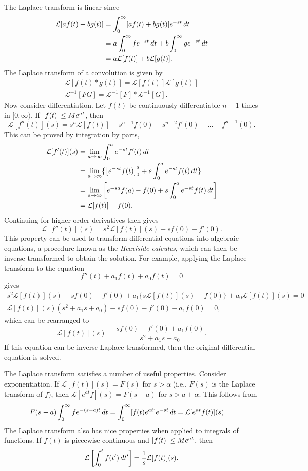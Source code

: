 The Laplace transform is linear since
\begin{align*}
	\mathcal{L}[af(t)+bg(t)]&=\int_0^{\infty}[af(t)+bg(t)]e^{-st}\mathop{}\!d t\\
	&=a\int_0^{\infty}fe^{-st}\mathop{}\!d t+b\int_0^{\infty}ge^{-st}\mathop{}\!d t\\		
	& =	a\mathcal{L}[f(t)]+b\mathcal{L}[g(t)].	
\end{align*}
The Laplace transform of a convolution is given by
\begin{align*}
	\mathcal{L}[f(t)*g(t)]=\mathcal{L}[f(t)]\mathcal{L}[g(t)]\\ \mathcal{L}^{-1}[FG]=\mathcal{L}^{-1}[F]*\mathcal{L}^{-1}[G].
\end{align*}
Now consider differentiation. Let $ f(t) $ be continuously differentiable $ n-1 $ times in $ [0,\infty) $. If $ \left\lvert f(t)\right\rvert\leq Me^{at} $, then
\[
\mathcal{L}[f^{n}(t)](s)=s^n\mathcal{L}[f(t)]-s^{n-1}f(0)-s^{n-2}f'(0)-\ldots-f^{n-1}(0).\]
This can be proved by integration by parts,
\begin{align*}
	\mathcal{L}[f'(t)](s)&=\lim_{a\to\infty}\int_0^a e^{-st}f'(t)\mathop{}\!d t\\	
	&=\lim_{a\to \infty}\{\left[e^{-st}f(t)\right]_0^a +s\int_0^a e^{-st}f(t)\mathop{}\!d t\}	\\
	&=\lim_{a\to\infty}\left[e^{-sa}f(a)-f(0)+s\int_0^a e^{-st}f(t)\mathop{}\!d t\right]\\	
	&=\mathcal{L}[f(t)]-f(0).
\end{align*}
Continuing for higher-order derivatives then gives
\[\mathcal{L}[f''(t)](s)=s^2\mathcal{L}[f(t)](s)-sf(0)-f'(0). 	
\]
This property can be used to transform differential equations into algebraic equations, a procedure known as the \emph{Heaviside calculus}, which can then be inverse transformed to obtain the solution. For example, applying the Laplace transform to the equation
\[f''(t)+a_1f(t)+a_0f(t)=0\] 	
gives
\begin{align*}
	s^2\mathcal{L}[f(t)](s)-sf(0)-f'(0)+a_1\{s\mathcal{L}[f(t)](s)-f(0)\} +a_0\mathcal{L}[f(t)](s)=0\\
	\mathcal{L}[f(t)](s)(s^2+a_1s+a_0)-sf(0)-f'(0)-a_1f(0)=0, 	
\end{align*}
which can be rearranged to
\[\mathcal{L}[f(t)](s)=\frac{sf(0)+f'(0)+a_1f(0)}{s^2+a_1s+a_0}. 	\]
If this equation can be inverse Laplace transformed, then the original differential equation is solved.

The Laplace transform satisfies a number of useful properties. Consider exponentiation. If $ \mathcal{L}[f(t)](s)=F(s) $ for $ s>\alpha $ (i.e., $ F(s) $ is the Laplace transform of $ f $), then $ \mathcal{L}[e^{at}f](s)=F(s-a) $ for $ s>a+\alpha $. This follows from
\begin{align}
	F(s-a)\int_0^{\infty}fe^{-(s-a)t}\mathop{}\!d t=\int_0^{\infty}[f(t)e^{at}]e^{-st}\mathop{}\!d t	
	&=\mathcal{L}[e^{at}f(t)](s).
\end{align}		
The Laplace transform also has nice properties when applied to integrals of functions. If $ f(t) $ is piecewise continuous and $ \left\lvert f(t)\right\rvert\leq Me^{at} $, then
\[\mathcal{L}\left[\int_0^tf(t')\mathop{}\!d t'\right]=\frac{1}{s}\mathcal{L}[f(t)](s).\] 	 
